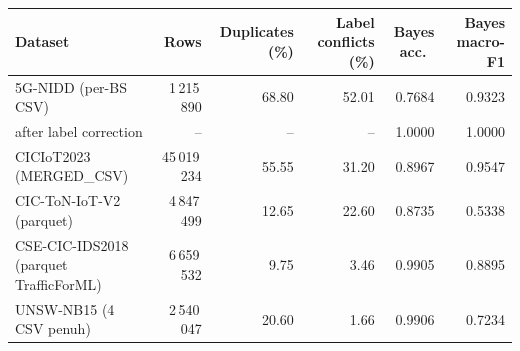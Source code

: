 \begin{tabular}{l r rr rr}
\toprule
Dataset & Rows & Duplicates (\%) & Label conflicts (\%) & Bayes acc.\ & Bayes macro-F1\\
\midrule
5G-NIDD (per-BS CSV) & 1\,215\,890 & 68.80 & 52.01 & 0.7684 & 0.9323\\
\quad after label correction & -- & -- & -- & 1.0000 & 1.0000\\
CICIoT2023 (MERGED\_CSV) & 45\,019\,234 & 55.55 & 31.20 & 0.8967 & 0.9547\\
CIC-ToN-IoT-V2 (parquet) & 4\,847\,499 & 12.65 & 22.60 & 0.8735 & 0.5338\\
CSE-CIC-IDS2018 (parquet TrafficForML) & 6\,659\,532 & 9.75 & 3.46 & 0.9905 & 0.8895\\
UNSW-NB15 (4 CSV penuh) & 2\,540\,047 & 20.60 & 1.66 & 0.9906 & 0.7234\\
\bottomrule
\end{tabular}
